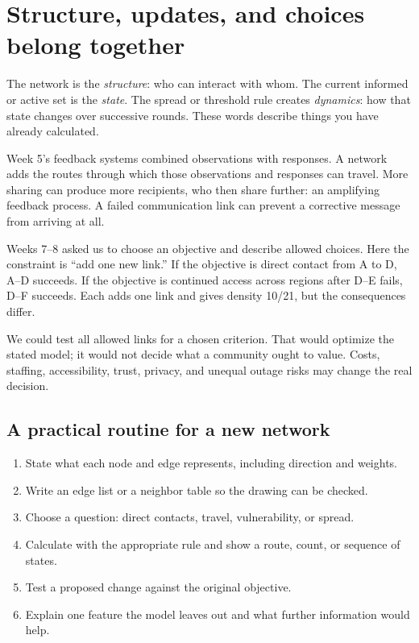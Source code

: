 \documentclass[11pt,letterpaper]{article}
\begin{document}
\clearpage

\section{Structure, updates, and choices belong together}


The network is the \emph{structure}: who can interact with whom. The current informed or active set is the \emph{state}. The spread or threshold rule creates \emph{dynamics}: how that state changes over successive rounds. These words describe things you have already calculated.


Week 5's feedback systems combined observations with responses. A network adds the routes through which those observations and responses can travel. More sharing can produce more recipients, who then share further: an amplifying feedback process. A failed communication link can prevent a corrective message from arriving at all.



\begin{tcolorbox}[title={Example \textperiodcentered{} A constrained design decision},breakable]

Weeks 7--8 asked us to choose an objective and describe allowed choices. Here the constraint is ``add one new link.'' If the objective is direct contact from A to D, A--D succeeds. If the objective is continued access across regions after D--E fails, D--F succeeds. Each adds one link and gives density 10/21, but the consequences differ.


We could test all allowed links for a chosen criterion. That would optimize the stated model; it would not decide what a community ought to value. Costs, staffing, accessibility, trust, privacy, and unequal outage risks may change the real decision.


\end{tcolorbox}


\subsection*{A practical routine for a new network}

\begin{enumerate}
\item State what each node and edge represents, including direction and weights.
\item Write an edge list or a neighbor table so the drawing can be checked.
\item Choose a question: direct contacts, travel, vulnerability, or spread.
\item Calculate with the appropriate rule and show a route, count, or sequence of states.
\item Test a proposed change against the original objective.
\item Explain one feature the model leaves out and what further information would help.

\end{enumerate}
\end{document}
